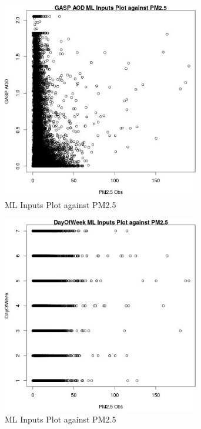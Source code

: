 \begin{figure} 
\centering  
\includegraphics[width=0.77\textwidth]{Code_Outputs/Report_ML_input_PM25_Step4_part_e_de_duplicated_aves_GASP_AODvPM25_Obs.jpg} 
\caption{\label{fig:Report_ML_input_PM25_Step4_part_e_de_duplicated_avesGASP_AODvPM25_Obs}ML Inputs Plot against PM2.5} 
\end{figure} 
 

\clearpage 

\begin{figure} 
\centering  
\includegraphics[width=0.77\textwidth]{Code_Outputs/Report_ML_input_PM25_Step4_part_e_de_duplicated_aves_DayOfWeekvPM25_Obs.jpg} 
\caption{\label{fig:Report_ML_input_PM25_Step4_part_e_de_duplicated_avesDayOfWeekvPM25_Obs}ML Inputs Plot against PM2.5} 
\end{figure} 
 

